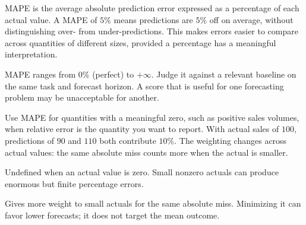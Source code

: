 MAPE is the average absolute prediction error expressed as a percentage of each actual value. A MAPE of $5\%$ means predictions are $5\%$ off on average, without distinguishing over- from under-predictions. This makes errors easier to compare across quantities of different sizes, provided a percentage has a meaningful interpretation.

\begin{metricformula}
\end{metricformula}

MAPE ranges from $0\%$ (perfect) to $+\infty$. Judge it against a relevant baseline on the same task and forecast horizon. A score that is useful for one forecasting problem may be unacceptable for another.


Use MAPE for quantities with a meaningful zero, such as positive sales volumes, when relative error is the quantity you want to report. With actual sales of $100$, predictions of $90$ and $110$ both contribute $10\%$. The weighting changes across actual values: the same absolute miss counts more when the actual is smaller.

{
    \item Undefined when an actual value is zero. Small nonzero actuals can produce enormous but finite percentage errors.
    \item Gives more weight to small actuals for the same absolute miss. Minimizing it can favor lower forecasts; it does not target the mean outcome.
}


